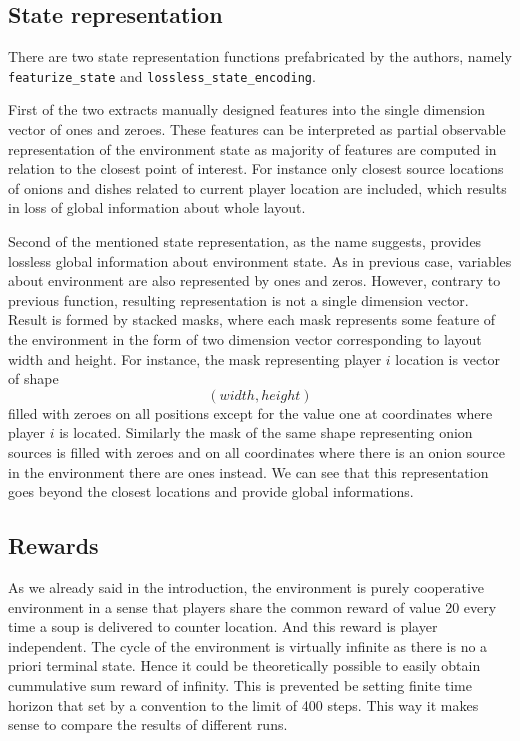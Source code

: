 \subsection{State representation}
There are two state representation functions prefabricated by the authors, namely \texttt{featurize\_state} and \texttt{lossless\_state\_encoding}.

First of the two extracts manually designed features into the single dimension vector of ones and zeroes. 
These features can be interpreted as partial observable representation of the environment state as majority of features are computed in relation to the closest point of interest.
For instance only closest source locations of onions and dishes related to current player location are included, which results in loss of global information about whole layout. 

Second of the mentioned state representation, as the name suggests, provides lossless global information about environment state.
As in previous case, variables about environment are also represented by ones and zeros. 
However, contrary to previous function, resulting representation is not a single dimension vector.
Result is formed by stacked masks, where each mask represents some feature of the environment in the form of two dimension vector corresponding to layout width and height.
For instance, the mask representing player $i$ location is vector of shape \[(width, height)\] filled with zeroes on all positions except for the value one at coordinates where player $i$ is located.
Similarly the mask of the same shape representing onion sources is filled with zeroes and on all coordinates where there is an onion source in the environment there are ones instead.
We can see that this representation goes beyond the closest locations and provide global informations.

\subsection{Rewards}
As we already said in the introduction, the environment is purely cooperative environment in a sense that players share the common reward of value 20 every time a soup is delivered to counter location.
And this reward is player independent. 
The cycle of the environment is virtually infinite as there is no a priori terminal state. 
Hence it could be theoretically possible to easily obtain cummulative sum reward of infinity.
This is prevented be setting finite time horizon that set by a convention to the limit of 400 steps.
This way it makes sense to compare the results of different runs.

